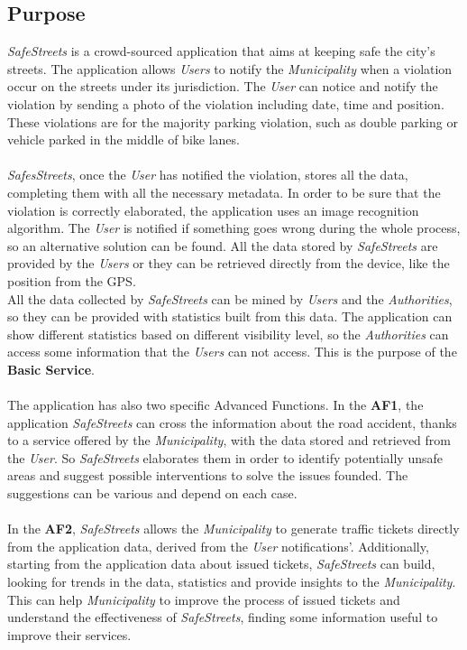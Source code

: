 \documentclass {article}
\begin{document}
	
	\subsection{Purpose}
	
	{\it SafeStreets} is a crowd-sourced application that aims at keeping safe the city's streets. The application allows {\it Users} to notify the {\it Municipality} when a violation occur on the streets under its jurisdiction. The {\it User} can notice and notify the violation by sending a photo of the violation including date, time and position. These violations are for the majority parking violation, such as double parking or vehicle parked in the middle of bike lanes. \\ \\
	{\it SafesStreets}, once the {\it User} has notified the violation, stores all the data, completing them with all the necessary metadata. In order to be sure that the violation is correctly elaborated, the application uses an image recognition algorithm. The {\it User} is notified if something goes wrong during the whole process, so an alternative solution can be found. All the data stored by {\it SafeStreets} are provided by the {\it Users} or they can be retrieved directly from the device, like the position from the GPS.\\
	All the data collected by {\it SafeStreets} can be mined by {\it Users} and the {\it Authorities}, so they can be provided with statistics built from this data. The application can show different statistics based on different visibility level, so the {\it Authorities} can access some information that the {\it Users} can not access. This is the purpose of the {\bf Basic Service}. \\ \\
	The application has also two specific Advanced Functions. In the {\bf AF1}, the application {\it SafeStreets} can cross the information about the road accident, thanks to a service offered by the {\it Municipality}, with the data stored and retrieved from the {\it User}. So {\it SafeStreets} elaborates them in order to identify potentially unsafe areas and suggest possible interventions to solve the issues founded. The suggestions can be various and depend on each case. \\ \\
	In the   {\bf AF2}, {\it SafeStreets} allows the {\it Municipality} to generate traffic tickets directly from the application data, derived from the {\it User} notifications'. Additionally, starting from the application data about issued tickets, {\it SafeStreets} can build, looking for trends in the data, statistics and provide insights to the {\it Municipality}. This can help {\it Municipality} to improve the process of issued tickets and understand the effectiveness of {\it SafeStreets}, finding some information useful to improve their services. \\ \\
\end{document}
